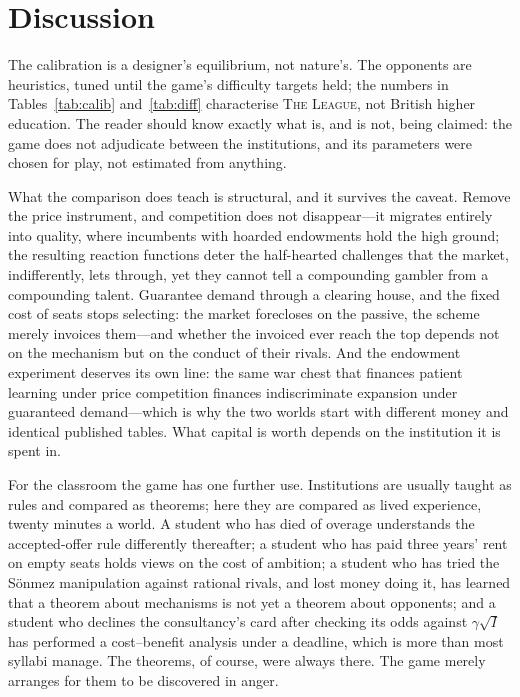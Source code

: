 \documentclass[11pt,a4paper]{article}
\newcommand{\game}{\textsc{The League}}
\begin{document}
\section{Discussion}\label{sec:disc}

The calibration is a designer's equilibrium, not nature's. The opponents are heuristics, tuned until the game's difficulty targets held; the numbers in Tables~\ref{tab:calib} and~\ref{tab:diff} characterise \game{}, not British higher education. The reader should know exactly what is, and is not, being claimed: the game does not adjudicate between the institutions, and its parameters were chosen for play, not estimated from anything.

What the comparison does teach is structural, and it survives the caveat. Remove the price instrument, and competition does not disappear---it migrates entirely into quality, where incumbents with hoarded endowments hold the high ground; the resulting reaction functions deter the half-hearted challenges that the market, indifferently, lets through, yet they cannot tell a compounding gambler from a compounding talent. Guarantee demand through a clearing house, and the fixed cost of seats stops selecting: the market forecloses on the passive, the scheme merely invoices them---and whether the invoiced ever reach the top depends not on the mechanism but on the conduct of their rivals. And the endowment experiment deserves its own line: the same war chest that finances patient learning under price competition finances indiscriminate expansion under guaranteed demand---which is why the two worlds start with different money and identical published tables. What capital is worth depends on the institution it is spent in.

For the classroom the game has one further use. Institutions are usually taught as rules and compared as theorems; here they are compared as lived experience, twenty minutes a world. A student who has died of overage understands the accepted-offer rule differently thereafter; a student who has paid three years' rent on empty seats holds views on the cost of ambition; a student who has tried the S\"onmez manipulation against rational rivals, and lost money doing it, has learned that a theorem about mechanisms is not yet a theorem about opponents; and a student who declines the consultancy's card after checking its odds against $\gamma\sqrt{I}$ has performed a cost--benefit analysis under a deadline, which is more than most syllabi manage. The theorems, of course, were always there. The game merely arranges for them to be discovered in anger.
\end{document}
